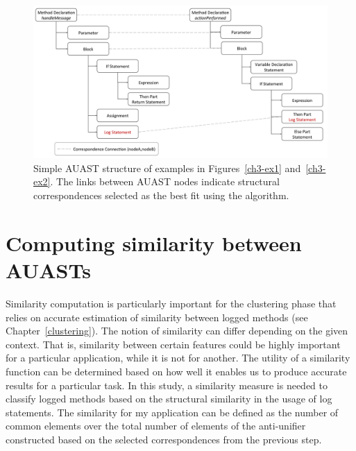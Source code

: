 \begin{figure}
  \centering\includegraphics [width = \textwidth, height=0.5\textheight]{Drawing4/FirstCorr.pdf}
  \caption{Simple AUAST structure of examples in Figures~\ref{ch3-ex1} and~\ref{ch3-ex2}. The links between AUAST nodes indicate structural correspondences selected as the best fit using the  algorithm.}
  \label{fig:AUASTs}
\end{figure}

\section{Computing similarity between AUASTs} \label{meth-similarity}
Similarity computation is particularly important for the clustering phase that relies on accurate estimation of similarity between logged methods (see Chapter~\ref{clustering}). The notion of similarity can differ depending on the given context. That is, similarity between certain features could be highly important for a particular application, while it is not for another. The utility of a similarity function can be determined based on how well it enables us to produce accurate results for a particular task. In this study, a similarity measure is needed to classify logged methods based on the structural similarity in the usage of log statements. The similarity for my application can be defined as the number of common elements over the total number of elements of the anti-unifier constructed based on the selected correspondences from the previous step.

